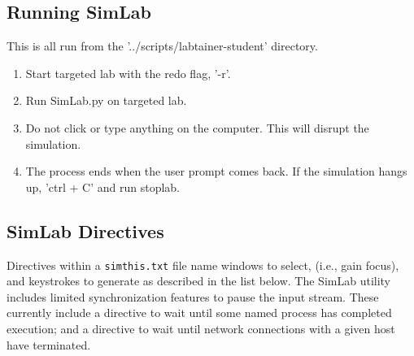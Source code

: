 \documentclass[12pt]{article}
\begin{document}
\subsection {Running SimLab}
This is all run from the '../scripts/labtainer-student' directory.
\begin{enumerate}
	\item Start targeted lab with the redo flag, '-r'.
	\item Run SimLab.py on targeted lab.
	\item Do not click or type anything on the computer. This will disrupt the simulation. 
	\item The process ends when the user prompt comes back. If the simulation hangs up, 'ctrl + C' and run stoplab.
\end{enumerate}


\subsection {SimLab Directives}
Directives within a {\tt simthis.txt} file name windows to select, (i.e., gain focus),
and keystrokes to generate as described in the list below.  The SimLab utility includes
limited synchronization features to pause the input stream.  These currently include a
directive to wait until some named process has completed execution; and a directive to wait
until network connections with a given host have terminated.
\end{document}
